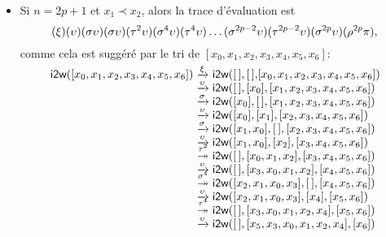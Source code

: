 \begin{itemize}

\item Si \(n = 2p+1\) et \(x_1 \prec x_2\), alors la trace
  d'évaluation est
    \begin{equation*}
    \hspace*{-2pt}(\xi)(\upsilon)(\sigma\upsilon)(\sigma\upsilon)
    (\tau^2\upsilon)(\sigma^4\upsilon)(\tau^4\upsilon) \ldots
    (\sigma^{2p-2}\upsilon)(\tau^{2p-2}\upsilon)(\sigma^{2p}\upsilon)
    (\rho^{2p}\pi),
    \end{equation*}
    \!comme cela est suggéré par le tri de \([x_0,x_1,x_2,x_3,x_4,x_5,x_6]\):
    \begin{equation*}
      \!\begin{array}{@{\!}r@{\;}c@{\;}l@{\!\!}}
        \fun{i2w}([x_0,x_1,x_2,x_3,x_4,x_5,x_6])
        & \xrightarrow{\smash{\xi}}
        & \fun{i2w}(\el,\el,\![x_0,x_1,x_2,x_3,x_4,x_5,x_6])\\
        & \xrightarrow{\smash{\upsilon}}
        & \fun{i2w}(\el,[x_0],[x_1,x_2,x_3,x_4,x_5,x_6])\\
        & \xrightarrow{\smash{\sigma}}
        & \fun{i2w}([x_0],\el,[x_1,x_2,x_3,x_4,x_5,x_6])\\
        & \xrightarrow{\smash{\upsilon}}
        & \fun{i2w}([x_0],[x_1],[x_2,x_3,x_4,x_5,x_6])\\
        & \xrightarrow{\smash{\sigma}}
        & \fun{i2w}([x_1,x_0],\el,[x_2,x_3,x_4,x_5,x_6])\\
        & \xrightarrow{\smash{\upsilon}}
        & \fun{i2w}([x_1,x_0],[x_2],[x_3,x_4,x_5,x_6])\\
        & \stackrel{\smash{\tau^{\smash{2}}}}{\twoheadrightarrow}
        & \fun{i2w}(\el,[x_0,x_1,x_2],[x_3,x_4,x_5,x_6])\\
        & \xrightarrow{\smash{\upsilon}}
        & \fun{i2w}(\el,[x_3,x_0,x_1,x_2],[x_4,x_5,x_6])\\
        & \stackrel{\smash{\sigma^{\smash{4}}}}{\twoheadrightarrow}
        & \fun{i2w}([x_2,x_1,x_0,x_3],\el,[x_4,x_5,x_6])\\
        & \xrightarrow{\smash{\upsilon}}
        & \fun{i2w}([x_2,x_1,x_0,x_3],[x_4],[x_5,x_6])\\
        & \stackrel{\smash{\tau^{\smash{4}}}}{\twoheadrightarrow}
        & \fun{i2w}(\el,[x_3,x_0,x_1,x_2,x_4],[x_5,x_6])\\
        & \xrightarrow{\smash{\upsilon}}
        & \fun{i2w}(\el,[x_5,x_3,x_0,x_1,x_2,x_4],[x_6])\\

\end{array}
\end{equation*}
\end{itemize}
